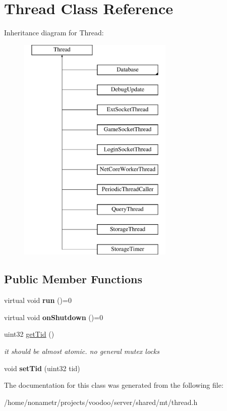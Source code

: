 \hypertarget{classThread}{\section{\-Thread \-Class \-Reference}
\label{classThread}
}
\-Inheritance diagram for \-Thread\-:\begin{figure}[H]
\begin{center}
\leavevmode
\includegraphics[height=11.000000cm]{classThread}
\end{center}
\end{figure}
\subsection*{\-Public \-Member \-Functions}
\begin{DoxyCompactItemize}
\item 
\hypertarget{classThread_aae90dfabab3e1776cf01a26e7ee3a620}{virtual void {\bfseries run} ()=0}\label{classThread_aae90dfabab3e1776cf01a26e7ee3a620}

\item 
\hypertarget{classThread_a9e30c8ade61860ebed96ce7ae5d0c0c1}{virtual void {\bfseries on\-Shutdown} ()=0}\label{classThread_a9e30c8ade61860ebed96ce7ae5d0c0c1}

\item 
\hypertarget{classThread_a39d788a3763b73e731196443edd4861f}{uint32 \hyperlink{classThread_a39d788a3763b73e731196443edd4861f}{get\-Tid} ()}\label{classThread_a39d788a3763b73e731196443edd4861f}

\begin{DoxyCompactList}\small\item\em it should be almost atomic. no general mutex locks \end{DoxyCompactList}\item 
\hypertarget{classThread_aec61ef8c40be81a63837315bc659c1a9}{void {\bfseries set\-Tid} (uint32 tid)}\label{classThread_aec61ef8c40be81a63837315bc659c1a9}

\end{DoxyCompactItemize}


\-The documentation for this class was generated from the following file\-:\begin{DoxyCompactItemize}
\item 
/home/nonametr/projects/voodoo/server/shared/mt/thread.\-h\end{DoxyCompactItemize}
